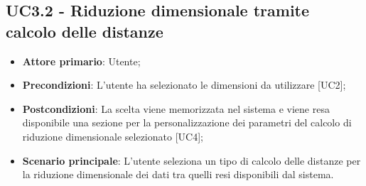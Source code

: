 \subsection{UC3.2 - Riduzione dimensionale tramite calcolo delle distanze}
\begin{itemize}
	\item \textbf{Attore primario}: Utente;
	\item \textbf{Precondizioni}: L'utente ha selezionato le dimensioni da utilizzare [UC2];
	\item \textbf{Postcondizioni}: La scelta viene memorizzata nel sistema e viene resa disponibile una sezione per la personalizzazione dei parametri del calcolo di riduzione dimensionale selezionato [UC4];
	\item \textbf{Scenario principale}: L'utente seleziona un tipo di calcolo delle distanze per la riduzione dimensionale dei dati tra quelli resi disponibili dal sistema.
\end{itemize}